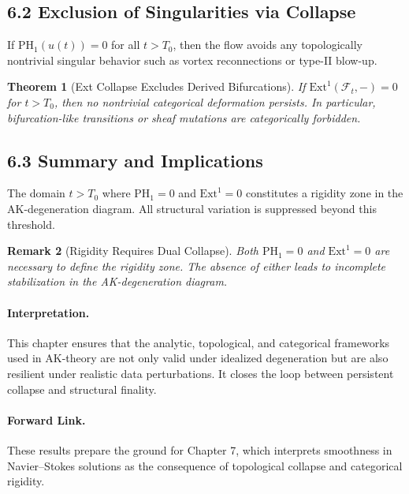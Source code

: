 \documentclass[11pt]{article}
\newtheorem{theorem}{Theorem}[section]
\newtheorem{remark}[theorem]{Remark}
\begin{document}
\subsection{6.2 Exclusion of Singularities via Collapse}

\begin{proposition}
If $\mathrm{PH}_1(u(t)) = 0$ for all $t > T_0$, then the flow avoids any topologically nontrivial singular behavior such as vortex reconnections or type-II blow-up.
\end{proposition}

\begin{theorem}[Ext Collapse Excludes Derived Bifurcations]
If $\mathrm{Ext}^1(\mathcal{F}_t, -) = 0$ for $t > T_0$, then no nontrivial categorical deformation persists. In particular, bifurcation-like transitions or sheaf mutations are categorically forbidden.
\end{theorem}

\subsection{6.3 Summary and Implications}

\begin{corollary}
The domain $t > T_0$ where $\mathrm{PH}_1 = 0$ and $\mathrm{Ext}^1 = 0$ constitutes a rigidity zone in the AK-degeneration diagram. All structural variation is suppressed beyond this threshold.
\end{corollary}

\begin{remark}[Rigidity Requires Dual Collapse]
Both $\mathrm{PH}_1 = 0$ and $\mathrm{Ext}^1 = 0$ are necessary to define the rigidity zone. The absence of either leads to incomplete stabilization in the AK-degeneration diagram.
\end{remark}

\paragraph{Interpretation.} 
This chapter ensures that the analytic, topological, and categorical frameworks used in AK-theory are not only valid under idealized degeneration but are also resilient under realistic data perturbations. It closes the loop between persistent collapse and structural finality.

\paragraph{Forward Link.}
These results prepare the ground for Chapter 7, which interprets smoothness in Navier–Stokes solutions as the consequence of topological collapse and categorical rigidity.
\end{document}
